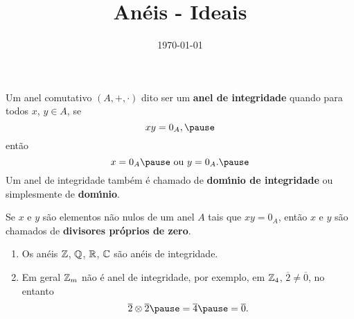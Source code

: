 \documentclass{beamer}
\title{Anéis - Ideais}
\author[\autor]{\autor}
\institute[\instituto]{\instituto}
\date{\today}
\begin{document}
    \begin{frame}
        \maketitle
    \end{frame}

    \begin{frame}
        \begin{definicao}
            Um anel comutativo $(A, + , \cdot)$  dito ser um \textbf{anel de integridade} \pause quando para todos $x$, $y \in A$, \pause se
            \[
                xy = 0_A,\pause
            \]
            ent{\~a}o
            \[
                x = 0_A\pause \mbox{ ou } y = 0_A.\pause
            \]
            Um anel de integridade tamb{\'e}m {\'e} chamado de \textbf{dom{\'\i}nio de integridade} \pause ou simplesmente de \textbf{dom{\'\i}nio}.\pause
        \end{definicao}

        \begin{observacao}
            Se $x$ e $y$ s{\~a}o elementos n{\~a}o nulos \pause de um anel $A$ \pause tais que $xy = 0_A$, \pause ent{\~a}o $x$ e $y$ s{\~a}o chamados de \pause \textbf{divisores pr{\'o}prios de zero}.\pause
        \end{observacao}
    \end{frame}

    \begin{frame}
        \begin{exemplos}
            \begin{enumerate}[label={\arabic*})]
                \item Os an{\'e}is $\mathbb{Z}$, \pause $\mathbb{Q}$, \pause $\mathbb{R}$, \pause $\mathbb{C}$ \pause s{\~a}o an{\'e}is de integridade.\pause
                
                \vspace{.5cm}

                \item Em geral $\mathbb{Z}_m$ \pause n{\~a}o {\'e} anel de integridade, \pause por exemplo, em $\mathbb{Z}_4$, \pause $\overline{2} \neq \overline{0}$, \pause no entanto
                \[
                    \overline{2}\otimes \overline{2} \pause = \overline{4} \pause = \overline{0}.
                \]
                \vspace{.5cm}

                \seti
            \end{enumerate}
        \end{exemplos}
    \end{frame}
\end{document}
